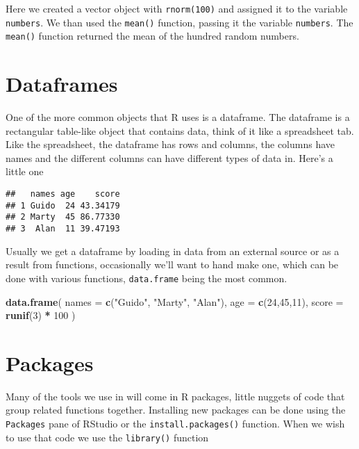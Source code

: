 \documentclass[
]{book}
\newenvironment{Shaded}{\begin{snugshade}}{\end{snugshade}}
\newcommand{\DataTypeTok}[1]{\textcolor[rgb]{0.13,0.29,0.53}{#1}}
\newcommand{\DecValTok}[1]{\textcolor[rgb]{0.00,0.00,0.81}{#1}}
\newcommand{\KeywordTok}[1]{\textcolor[rgb]{0.13,0.29,0.53}{\textbf{#1}}}
\newcommand{\NormalTok}[1]{#1}
\newcommand{\OperatorTok}[1]{\textcolor[rgb]{0.81,0.36,0.00}{\textbf{#1}}}
\newcommand{\StringTok}[1]{\textcolor[rgb]{0.31,0.60,0.02}{#1}}
\begin{document}
Here we created a vector object with \texttt{rnorm(100)} and assigned it to the variable \texttt{numbers}. We than used the \texttt{mean()} function, passing it the variable \texttt{numbers}. The \texttt{mean()} function returned the mean of the hundred random numbers.

\hypertarget{dataframes}{%
\section{Dataframes}\label{dataframes}}

One of the more common objects that R uses is a dataframe. The dataframe is a rectangular table-like object that contains data, think of it like a spreadsheet tab. Like the spreadsheet, the dataframe has rows and columns, the columns have names and the different columns can have different types of data in. Here's a little one

\begin{verbatim}
##   names age    score
## 1 Guido  24 43.34179
## 2 Marty  45 86.77330
## 3  Alan  11 39.47193
\end{verbatim}

Usually we get a dataframe by loading in data from an external source or as a result from functions, occasionally we'll want to hand make one, which can be done with various functions, \texttt{data.frame} being the most common.

\begin{Shaded}
\begin{Highlighting}[]
\KeywordTok{data.frame}\NormalTok{(}
  \DataTypeTok{names =} \KeywordTok{c}\NormalTok{(}\StringTok{"Guido"}\NormalTok{, }\StringTok{"Marty"}\NormalTok{, }\StringTok{"Alan"}\NormalTok{),}
  \DataTypeTok{age =} \KeywordTok{c}\NormalTok{(}\DecValTok{24}\NormalTok{,}\DecValTok{45}\NormalTok{,}\DecValTok{11}\NormalTok{),}
  \DataTypeTok{score =} \KeywordTok{runif}\NormalTok{(}\DecValTok{3}\NormalTok{) }\OperatorTok{*}\StringTok{ }\DecValTok{100}
\NormalTok{)}
\end{Highlighting}
\end{Shaded}

\hypertarget{packages}{%
\section{Packages}\label{packages}}

Many of the tools we use in will come in R packages, little nuggets of code that group related functions together. Installing new packages can be done using the \texttt{Packages} pane of RStudio or the \texttt{install.packages()} function. When we wish to use that code we use the \texttt{library()} function
\end{document}

